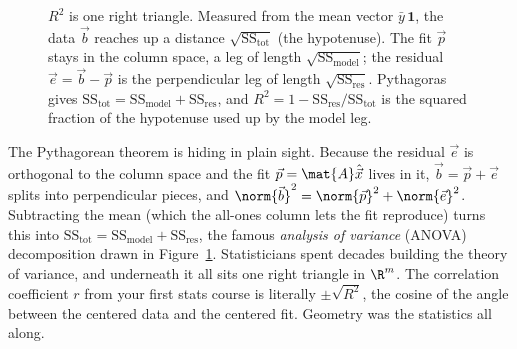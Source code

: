 \begin{figure}[H]
\centering
{}
\caption{$R^2$ is one right triangle. Measured from the mean vector $\bar{y}\,\mathbf{1}$, the data
$\vec{b}$ reaches up a distance $\sqrt{\mathrm{SS_{tot}}}$ (the hypotenuse). The fit $\vec{p}$ stays
in the column space, a leg of length $\sqrt{\mathrm{SS_{model}}}$; the residual $\vec{e}=\vec{b}
-\vec{p}$ is the perpendicular leg of length $\sqrt{\mathrm{SS_{res}}}$. Pythagoras gives
$\mathrm{SS_{tot}}=\mathrm{SS_{model}}+\mathrm{SS_{res}}$, and $R^2=1-\mathrm{SS_{res}}/
\mathrm{SS_{tot}}$ is the squared fraction of the hypotenuse used up by the model leg.}
\label{ch19:rsquared-triangle}
\end{figure}

\begin{connectionbox}
The Pythagorean theorem is hiding in plain sight. Because the residual $\vec{e}$ is orthogonal to
the column space and the fit $\vec{p}=\mat{A}\hat{\vec{x}}$ lives in it, $\vec{b}=\vec{p}+\vec{e}$
splits into perpendicular pieces, and $\norm{\vec{b}}^2=\norm{\vec{p}}^2+\norm{\vec{e}}^2$.
Subtracting the mean (which the all-ones column lets the fit reproduce) turns this into
$\mathrm{SS_{tot}}=\mathrm{SS_{model}}+\mathrm{SS_{res}}$, the famous \emph{analysis of variance}
(ANOVA) decomposition drawn in Figure~\ref{ch19:rsquared-triangle}. Statisticians spent decades building the theory of variance, and underneath
it all sits one right triangle in $\R^m$. The correlation coefficient $r$ from your first stats
course is literally $\pm\sqrt{R^2}$, the cosine of the angle between the centered data and the
centered fit. Geometry was the statistics all along.
\end{connectionbox}

